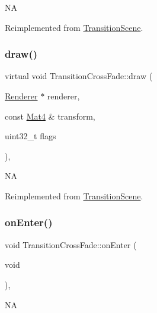 NA 

Reimplemented from \hyperlink{classTransitionScene_ae3600e652909eeae3113bc39ce8ef8d1}{Transition\+Scene}.

\mbox{\label{classTransitionCrossFade_a5eeb7d0ad58586a1b0971d12275a5460}} 
\subsubsection{\texorpdfstring{draw()}{draw()}\hspace{0.1cm}{\footnotesize\ttfamily [2/2]}}
{\footnotesize\ttfamily virtual void Transition\+Cross\+Fade\+::draw (\begin{DoxyParamCaption}\item[{\hyperlink{classRenderer}{Renderer} $\ast$}]{renderer,  }\item[{const \hyperlink{classMat4}{Mat4} \&}]{transform,  }\item[{uint32\+\_\+t}]{flags }\end{DoxyParamCaption})\hspace{0.3cm}{\ttfamily [override]}, {\ttfamily [virtual]}}

NA 

Reimplemented from \hyperlink{classTransitionScene_ae3600e652909eeae3113bc39ce8ef8d1}{Transition\+Scene}.

\mbox{\label{classTransitionCrossFade_a453757b830ce0be18bc27ded6634d949}} 
\subsubsection{\texorpdfstring{on\+Enter()}{onEnter()}\hspace{0.1cm}{\footnotesize\ttfamily [1/2]}}
{\footnotesize\ttfamily void Transition\+Cross\+Fade\+::on\+Enter (\begin{DoxyParamCaption}\item[{void}]{ }\end{DoxyParamCaption})\hspace{0.3cm}{\ttfamily [override]}, {\ttfamily [virtual]}}

NA 


